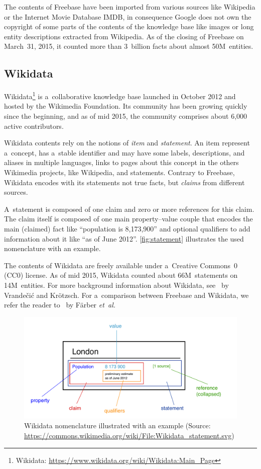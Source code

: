 \documentclass{sig-alternate}
\begin{document}
The contents of Freebase have been imported from various sources like Wikipedia
or the Internet Movie Database IMDB,
in consequence Google does not own the copyright of some parts of the contents of the knowledge base
like images or long entity descriptions extracted from Wikipedia.
As of the closing of Freebase on March~31, 2015,
it counted more than 3~billion facts about almost 50M~entities.

\subsection{Wikidata}

Wikidata\footnote{Wikidata: \url{https://www.wikidata.org/wiki/Wikidata:Main_Page}}
is a~collaborative knowledge base
launched in October 2012 and hosted by the Wikimedia Foundation.
Its community has been growing quickly since the beginning, and as of mid 2015,
the community comprises about 6,000 active contributors.

Wikidata contents rely on the notions of \emph{item} and \emph{statement}.
An item represent a~concept, has a~stable identifier and may have some labels,
descriptions, and aliases in multiple languages, links to pages about this concept
in the others Wikimedia projects, like Wikipedia, and statements.
Contrary to Freebase, Wikidata encodes with its statements not true facts,
but \emph{claims} from different sources.

A~statement is composed of one claim and zero or more references for this claim.
The claim itself is composed of one main property--value couple that encodes
the main (claimed) fact like ``population is 8,173,900'' and optional qualifiers
to add information about it like ``as of June 2012''.
\autoref{fig:statement} illustrates the used nomenclature with an example.

The contents of Wikidata are freely available under a~Creative Commons~0 (CC0) license.
As of mid 2015, Wikidata counted about 66M~statements on 14M~entities.
For more background information about Wikidata, see~\cite{vrandevcic2014wikidata}
by Vrandečić and Krötzsch.
For a~comparison between Freebase and Wikidata,
we refer the reader to~\cite{farbercomparative} by Färber \emph{et~al.}

\begin{figure}[!htbp]
\centering
\includegraphics[width=8.45 cm]{img/Wikidata_statement.pdf}
\caption{Wikidata nomenclature illustrated with an example (Source:
	\url{https://commons.wikimedia.org/wiki/File:Wikidata_statement.svg})}
\label{fig:statement}
\end{figure}
\end{document}
